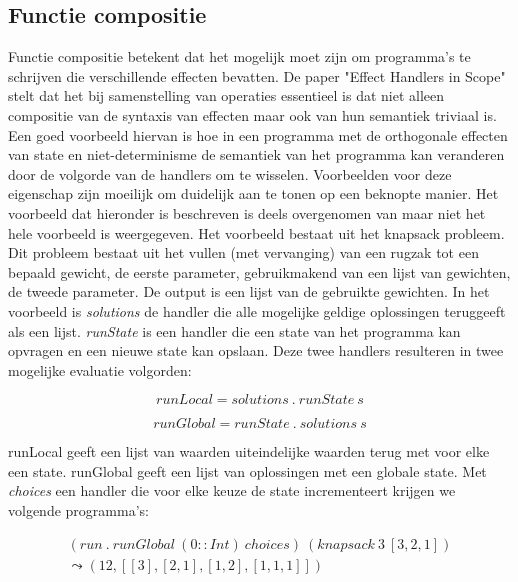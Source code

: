 \subsection{Functie compositie}
\label{subsec:funcComp}
Functie compositie betekent dat het mogelijk moet zijn om programma's te schrijven die verschillende effecten bevatten. De paper "Effect Handlers in Scope"\cite{Wu2014} stelt dat het bij samenstelling van operaties essentieel is dat niet alleen compositie van de syntaxis van effecten maar ook van hun semantiek triviaal is. Een goed voorbeeld hiervan is hoe in een programma met de orthogonale effecten van state en niet-determinisme de semantiek van het programma kan veranderen door de volgorde van de handlers om te wisselen. Voorbeelden voor deze eigenschap zijn moeilijk om duidelijk aan te tonen op een beknopte manier. Het voorbeeld dat hieronder is beschreven is deels overgenomen van \cite{Wu2014} maar niet het hele voorbeeld is weergegeven. Het voorbeeld bestaat uit het knapsack probleem. Dit probleem bestaat uit het vullen (met vervanging) van een rugzak tot een bepaald gewicht, de eerste parameter, gebruikmakend van een lijst van gewichten, de tweede parameter. De output is een lijst van de gebruikte gewichten. In het voorbeeld is \emph{solutions} de handler die alle mogelijke geldige oplossingen teruggeeft als een lijst. \emph{runState} is een handler die een state van het programma kan opvragen en een nieuwe state kan opslaan. Deze twee handlers resulteren in twee mogelijke evaluatie volgorden: 

\begin{equation}
    runLocal = solutions \  . \   runState \   s
\end{equation}

\begin{equation}
    runGlobal = runState \  . \   solutions \   s
\end{equation}

runLocal geeft een lijst van waarden uiteindelijke waarden terug met voor elke een state. runGlobal geeft een lijst van oplossingen met een globale state. Met \emph{choices} een handler die voor elke keuze de state incrementeert krijgen we volgende programma's:

\begin{equation}
    \begin{split}
        (run \  . \   runGlobal \  (0 :: Int) \   choices) \  (knapsack \   3 \  [3,2,1]) \\
        \leadsto (12,[[3],[2,1],[1,2],[1,1,1]])
    \end{split}
\end{equation}

